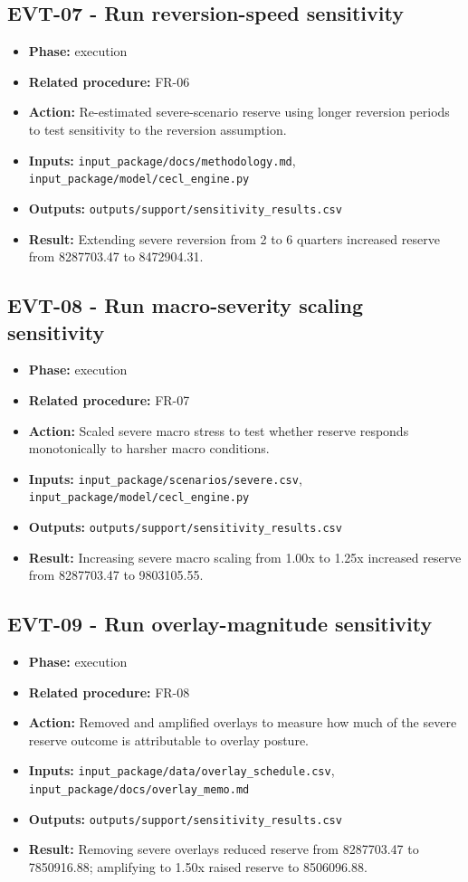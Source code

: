 \documentclass[11pt]{article}
\begin{document}
\subsection*{EVT-07 - Run reversion-speed sensitivity}
\begin{itemize}
\item \textbf{Phase:} execution
\item \textbf{Related procedure:} FR-06
\item \textbf{Action:} Re-estimated severe-scenario reserve using longer reversion periods to test sensitivity to the reversion assumption.
\item \textbf{Inputs:} \texttt{input\_package/docs/methodology.md}, \texttt{input\_package/model/cecl\_engine.py}
\item \textbf{Outputs:} \texttt{outputs/support/sensitivity\_results.csv}
\item \textbf{Result:} Extending severe reversion from 2 to 6 quarters increased reserve from 8287703.47 to 8472904.31.
\end{itemize}
\subsection*{EVT-08 - Run macro-severity scaling sensitivity}
\begin{itemize}
\item \textbf{Phase:} execution
\item \textbf{Related procedure:} FR-07
\item \textbf{Action:} Scaled severe macro stress to test whether reserve responds monotonically to harsher macro conditions.
\item \textbf{Inputs:} \texttt{input\_package/scenarios/severe.csv}, \texttt{input\_package/model/cecl\_engine.py}
\item \textbf{Outputs:} \texttt{outputs/support/sensitivity\_results.csv}
\item \textbf{Result:} Increasing severe macro scaling from 1.00x to 1.25x increased reserve from 8287703.47 to 9803105.55.
\end{itemize}
\subsection*{EVT-09 - Run overlay-magnitude sensitivity}
\begin{itemize}
\item \textbf{Phase:} execution
\item \textbf{Related procedure:} FR-08
\item \textbf{Action:} Removed and amplified overlays to measure how much of the severe reserve outcome is attributable to overlay posture.
\item \textbf{Inputs:} \texttt{input\_package/data/overlay\_schedule.csv}, \texttt{input\_package/docs/overlay\_memo.md}
\item \textbf{Outputs:} \texttt{outputs/support/sensitivity\_results.csv}
\item \textbf{Result:} Removing severe overlays reduced reserve from 8287703.47 to 7850916.88; amplifying to 1.50x raised reserve to 8506096.88.
\end{itemize}
\end{document}
